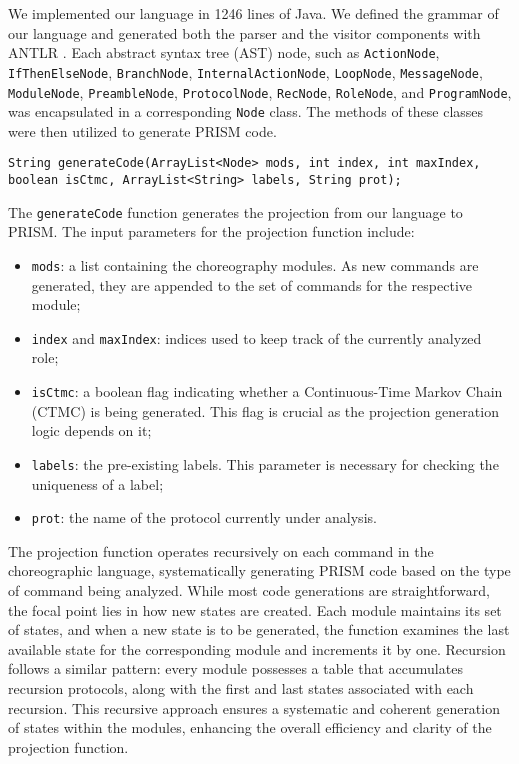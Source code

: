 We implemented our language in 1246 lines of Java.
We defined the grammar of our language and generated both the parser and the visitor components with ANTLR \cite{ANTLR}.
Each abstract syntax tree (AST) node, such as {\tt ActionNode}, {\tt IfThenElseNode}, {\tt BranchNode}, {\tt InternalActionNode}, {\tt LoopNode}, {\tt MessageNode}, {\tt ModuleNode}, {\tt PreambleNode}, {\tt ProtocolNode}, {\tt RecNode}, {\tt RoleNode}, and {\tt ProgramNode}, was encapsulated in a corresponding {\tt Node} class. The methods of these classes were then utilized to generate PRISM code.
\begin{lstlisting}[language=Eclipse,caption=The \texttt{generateCode} function.,label=genfun1,numbers=none]
	String generateCode(ArrayList<Node> mods, int index, int maxIndex, boolean isCtmc, ArrayList<String> labels, String prot);	
\end{lstlisting}
The {\tt generateCode} function generates the projection from our language to PRISM.
The input parameters for the projection function include:
\begin{itemize}
\item \texttt{mods}: a list containing the choreography modules. As new commands are generated, they are appended to the set of commands for the respective module;
\item \texttt{index} and \texttt{maxIndex}: indices used to keep track of the currently analyzed role;
\item \texttt{isCtmc}: a boolean flag indicating whether a Continuous-Time Markov Chain (CTMC) is being generated. This flag is crucial as the projection generation logic depends on it;
\item \texttt{labels}: the pre-existing labels. This parameter is necessary for checking the uniqueness of a label;
\item \texttt{prot}: the name of the protocol currently under analysis.
\end{itemize}
The projection function operates recursively on each command in the choreographic language, systematically generating PRISM code based on the type of command being analyzed. While most code generations are straightforward, the focal point lies in how new states are created. Each module maintains its set of states, and when a new state is to be generated, the function examines the last available state for the corresponding module and increments it by one.
Recursion follows a similar pattern: every module possesses a table that accumulates recursion protocols, along with the first and last states associated with each recursion. This recursive approach ensures a systematic and coherent generation of states within the modules, enhancing the overall efficiency and clarity of the projection function.

